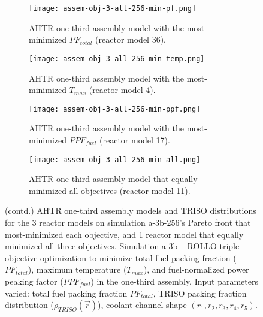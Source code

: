 \begin{figure}[htbp!]
    \ContinuedFloat
    \begin{subfigure}{0.49\textwidth}
        \centering
        \texttt{[image: assem-obj-3-all-256-min-pf.png]}
        \caption{\gls{AHTR} one-third assembly model with the most-minimized $PF_{total}$ 
        (reactor model 36).}
        \label{fig:assem-obj-3-all-256-min-pf} 
    \end{subfigure}
    \begin{subfigure}{0.49\textwidth}
        \centering
        \texttt{[image: assem-obj-3-all-256-min-temp.png]}
        \caption{\gls{AHTR} one-third assembly model with the most-minimized $T_{max}$
        (reactor model 4).}
        \label{fig:assem-obj-3-all-256-min-temp} 
    \end{subfigure}
    \begin{subfigure}{0.49\textwidth}
        \centering
        \texttt{[image: assem-obj-3-all-256-min-ppf.png]}
        \caption{\gls{AHTR} one-third assembly model with the most-minimized $PPF_{fuel}$
        (reactor model 17).}
        \label{fig:assem-obj-3-all-256-min-ppf} 
    \end{subfigure}
    \begin{subfigure}{0.49\textwidth}
        \centering
        \texttt{[image: assem-obj-3-all-256-min-all.png]}
        \caption{\gls{AHTR} one-third assembly model that equally minimized all 
        objectives (reactor model 11).}
        \label{fig:assem-obj-3-all-256-min-all} 
    \end{subfigure}
    \begin{subfigure}{.3\textwidth}
    \vspace{1cm}
    \centering
\end{subfigure}
    \caption{(contd.) AHTR one-third assembly models and TRISO distributions for the 3 reactor 
    models on simulation a-3b-256's Pareto front that most-minimized each objective, and 
    1 reactor model that equally minimized all three objectives.
    Simulation a-3b -- ROLLO triple-objective optimization to minimize 
    total fuel packing fraction ($PF_{total}$), maximum temperature ($T_{max}$), 
    and fuel-normalized power peaking factor ($PPF_{fuel}$) in the one-third assembly. 
    Input parameters varied: total fuel packing fraction $PF_{total}$, 
    TRISO packing fraction distribution ($\rho_{TRISO}(\vec{r})$), 
    coolant channel shape $(r_1, r_2, r_3, r_4, r_5)$.}
\end{figure}

